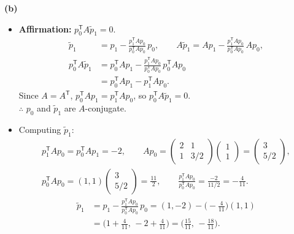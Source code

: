 \documentclass[11pt,a4paper]{article}
\newcommand{\T}{^{\mathsf T}}
\begin{document}
\textbf{(b)}
\begin{itemize}
\item \textbf{Affirmation:} $p_0\T A\tilde p_1=0$.
\begin{align*}
\tilde p_1&=p_1-\frac{p_1\T A p_0}{p_0\T A p_0}\,p_0,
\qquad
A\tilde p_1=Ap_1-\frac{p_1\T A p_0}{p_0\T A p_0}\,Ap_0,\\
p_0\T A\tilde p_1&=p_0\T A p_1-\frac{p_1\T A p_0}{p_0\T A p_0}\,p_0\T A p_0\\
&=p_0\T A p_1-p_1\T A p_0 .
\end{align*}
Since $A=A\T$, $p_0\T A p_1=p_1\T A p_0$, so $p_0\T A\tilde p_1=0$.\\
$\therefore$ $p_0$ and $\tilde p_1$ are $A$-conjugate.

\item Computing $\tilde p_1$:
\begin{gather*}
p_1\T A p_0=p_0\T A p_1=-2,\qquad
A p_0=\begin{pmatrix}2&1\\1&3/2\end{pmatrix}\begin{pmatrix}1\\1\end{pmatrix}=\begin{pmatrix}3\\5/2\end{pmatrix},\\
p_0\T A p_0=(1,1)\begin{pmatrix}3\\5/2\end{pmatrix}=\frac{11}{2},\qquad
\frac{p_1\T A p_0}{p_0\T A p_0}=\frac{-2}{11/2}=-\frac{4}{11}.
\end{gather*}
\begin{align*}
\tilde p_1&=p_1-\frac{p_1\T A p_0}{p_0\T A p_0}\,p_0
=(1,-2)-\Big(-\frac{4}{11}\Big)(1,1)\\
&=\Big(1+\frac{4}{11},\,-2+\frac{4}{11}\Big)=\Big(\frac{15}{11},\,-\frac{18}{11}\Big).
\end{align*}
\end{itemize}
\end{document}
